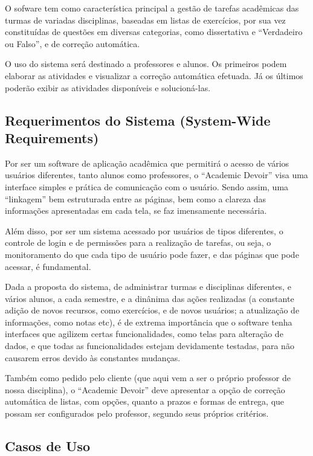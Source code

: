\documentclass[12pt,letterpaper]{article}
\begin{document}
O sofware tem como característica principal a gestão de tarefas acadêmicas das turmas de variadas disciplinas, baseadas em listas de exercícios, por sua vez constituídas de questões em diversas categorias, como dissertativa e ``Verdadeiro ou Falso'', e de correção automática.

O uso do sistema será destinado a professores e alunos. Os primeiros podem elaborar as atividades e visualizar a correção automática efetuada. Já os últimos poderão exibir as atividades disponíveis e solucioná-las.

\pagebreak

\subsection{Requerimentos do Sistema (System-Wide Requirements)}

Por ser um software de aplicação acadêmica que permitirá o acesso de vários usuários diferentes, tanto alunos como professores, o “Academic Devoir” visa uma interface simples e prática de comunicação com o usuário. Sendo assim, uma “linkagem” bem estruturada entre as páginas, bem como a clareza das informações apresentadas em cada tela, se faz imensamente necessária.

Além disso, por ser um sistema acessado por usuários de tipos diferentes, o controle de login e de permissões para a realização de tarefas, ou seja, o monitoramento do que cada tipo de usuário pode fazer, e das páginas que pode acessar, é fundamental.

Dada a proposta do sistema, de administrar turmas e disciplinas diferentes, e vários alunos, a cada semestre, e a dinânima das ações realizadas (a constante adição de novos recursos, como exercícios, e de novos usuários; a atualização de informações, como notas etc), é de extrema importância que o software tenha interfaces que agilizem certas funcionalidades, como telas para alteração de dados, e que todas as funcionalidades estejam devidamente testadas, para não causarem erros devido às constantes mudanças. 

Também como pedido pelo cliente (que aqui vem a ser o próprio professor de nossa disciplina), o “Academic Devoir” deve apresentar a opção de correção automática de listas, com opções, quanto a prazos e formas de entrega, que possam ser configurados pelo professor, segundo seus próprios critérios.

\pagebreak

\subsection{Casos de Uso}
\end{document}
